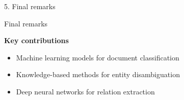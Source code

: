 \renewcommand{\CurrentProgressBarIs}{\FiveOfFive}
\begingroup
\begin{frame}[t,plain]{5. Final remarks}
\end{frame}
\endgroup
\begin{frame}[t]{Final remarks}

\vspace*{-3mm}

\scriptsize%

\newcommand{\minorscriptsize}{\fontsize{7.0pt}{8.4pt}\selectfont}
\newcommand{\minortiny}{\fontsize{5pt}{6pt}\selectfont}



\textbf{Key contributions}

\vspace*{-0.2\topsep}
\begin{itemize}

\setlength{\itemsep}{0.0pt plus 2.0pt minus 1.0pt}

\item
Machine learning models for document classification

\item
Knowledge-based methods for entity disambiguation

\item
Deep neural networks for relation extraction


\end{itemize}
\end{frame}
